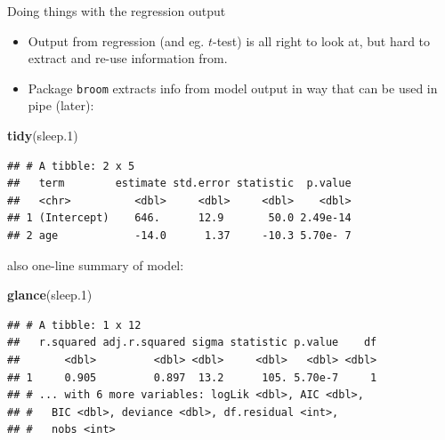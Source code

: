 \documentclass[
  ignorenonframetext,
]{beamer}
\newenvironment{Shaded}{\begin{snugshade}}{\end{snugshade}}
\newcommand{\FloatTok}[1]{\textcolor[rgb]{0.00,0.00,0.81}{#1}}
\newcommand{\KeywordTok}[1]{\textcolor[rgb]{0.13,0.29,0.53}{\textbf{#1}}}
\newcommand{\NormalTok}[1]{#1}
\begin{document}
\begin{frame}[fragile]{Doing things with the regression output}
\protect\hypertarget{doing-things-with-the-regression-output}{}

\begin{itemize}
\item
  Output from regression (and eg. \(t\)-test) is all right to look at,
  but hard to extract and re-use information from.
\item
  Package \texttt{broom} extracts info from model output in way that can
  be used in pipe (later):
\end{itemize}

\begin{Shaded}
\begin{Highlighting}[]
\KeywordTok{tidy}\NormalTok{(sleep}\FloatTok{.1}\NormalTok{)}
\end{Highlighting}
\end{Shaded}

\begin{verbatim}
## # A tibble: 2 x 5
##   term        estimate std.error statistic  p.value
##   <chr>          <dbl>     <dbl>     <dbl>    <dbl>
## 1 (Intercept)    646.      12.9       50.0 2.49e-14
## 2 age            -14.0      1.37     -10.3 5.70e- 7
\end{verbatim}

\end{frame}

\begin{frame}[fragile]{also one-line summary of model:}
\protect\hypertarget{also-one-line-summary-of-model}{}

\begin{Shaded}
\begin{Highlighting}[]
\KeywordTok{glance}\NormalTok{(sleep}\FloatTok{.1}\NormalTok{)}
\end{Highlighting}
\end{Shaded}

\begin{verbatim}
## # A tibble: 1 x 12
##   r.squared adj.r.squared sigma statistic p.value    df
##       <dbl>         <dbl> <dbl>     <dbl>   <dbl> <dbl>
## 1     0.905         0.897  13.2      105. 5.70e-7     1
## # ... with 6 more variables: logLik <dbl>, AIC <dbl>,
## #   BIC <dbl>, deviance <dbl>, df.residual <int>,
## #   nobs <int>
\end{verbatim}

\end{frame}
\end{document}
